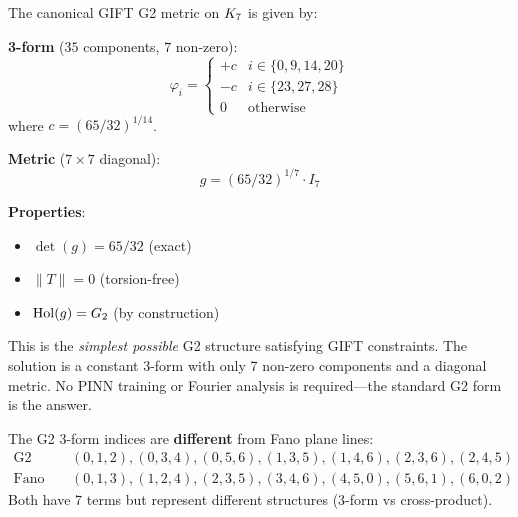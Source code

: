 \begin{theorem}\label{thm:analytical_metric}
    \leanok
    The canonical GIFT G2 metric on $K_7$ is given by:

    \textbf{3-form} ($35$ components, $7$ non-zero):
    \[
        \varphi_i = \begin{cases}
            +c & i \in \{0, 9, 14, 20\} \\
            -c & i \in \{23, 27, 28\} \\
            0 & \text{otherwise}
        \end{cases}
    \]
    where $c = (65/32)^{1/14}$.

    \textbf{Metric} ($7 \times 7$ diagonal):
    \[
        g = (65/32)^{1/7} \cdot I_7
    \]

    \textbf{Properties}:
    \begin{itemize}
        \item $\det(g) = 65/32$ (exact)
        \item $\|T\| = 0$ (torsion-free)
        \item $\mathrm{Hol}(g) = G_2$ (by construction)
    \end{itemize}
\end{theorem}

\begin{remark}[Simplicity]
    This is the \emph{simplest possible} G2 structure satisfying GIFT constraints.
    The solution is a constant 3-form with only 7 non-zero components and a
    diagonal metric. No PINN training or Fourier analysis is required---the
    standard G2 form is the answer.
\end{remark}

\begin{remark}[G2 vs Fano]
    The G2 3-form indices are \textbf{different} from Fano plane lines:
    \begin{align*}
        \text{G2 3-form:} &\quad (0,1,2), (0,3,4), (0,5,6), (1,3,5), (1,4,6), (2,3,6), (2,4,5) \\
        \text{Fano lines:} &\quad (0,1,3), (1,2,4), (2,3,5), (3,4,6), (4,5,0), (5,6,1), (6,0,2)
    \end{align*}
    Both have 7 terms but represent different structures (3-form vs cross-product).
\end{remark}

